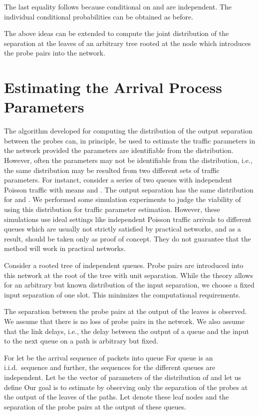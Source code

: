 \documentclass[11pt]{article}
\begin{document}
The last equality follows because conditional on   and
 are independent.  The individual conditional probabilities can
be obtained as before.

The above ideas can be extended to compute the joint distribution of
the separation at the leaves of an arbitrary tree rooted at the node
which introduces the probe pairs into the network.

\section{Estimating the Arrival Process Parameters}
\label{sec:estimating-A_n}

The algorithm developed for computing the distribution of the output
separation between the probes can, in principle, be used to estimate
the traffic parameters in the network provided the parameters are
identifiable from the distribution. However, often the parameters may
not be identifiable from the distribution, i.e., the same distribution
may be resulted from two different sets of traffic parameters. For
instanct, consider a series of two queues with independent Poisson
traffic with means  and . The output separation
has the same distribution for 
and . We performed some
simulation experiments to judge the viability of using this
distribution for traffic parameter estimation.  However, these
simulations use ideal settings like independent Poisson traffic
arrivals to different queues which are usually not strictly satisfied
by practical networks, and as a result, should be taken only as proof
of concept.  They do not guarantee that the method will work in
practical networks.

Consider a rooted tree of  independent queues. Probe pairs are
introduced into this network at the root of the tree with unit
separation.  While the theory allows for an arbitrary but known
distribution of the input separation, we choose a fixed input
separation of one slot. This minimizes the computational requirements.

The separation between the probe pairs at the output of the leaves is
observed. We assume that there is no loss of probe pairs in the
network. We also assume that the link delays, i.e., the delay between
the output of a queue and the input to the next queue on a path is
arbitrary but fixed.

For  let  be the arrival sequence of packets
into queue  For queue   is an i.i.d.~sequence and
further, the sequences for the different queues are independent.  Let
 be the vector of parameters of the distribution of
 and let us define  Our goal is to estimate  by observing
only the separation of the probes at the output of the leaves of the
paths.  Let  denote these leaf nodes and
 the separation of the probe
pairs at the output of these queues.
\end{document}
